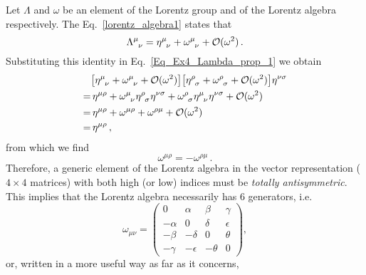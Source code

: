 \begin{sol}
    Let $\Lambda$ and $\omega$ be an element of the Lorentz group and of the Lorentz algebra respectively. The Eq.~\eqref{lorentz_algebra1} states that
    \begin{equation}
        \tensor{\Lambda}{^\mu_\nu} = \tensor{\g}{^\mu_\nu} + \tensor{\omega}{^\mu_\nu} + \mathcal{O}(\omega^2) \, .
    \end{equation}
    Substituting this identity in Eq.~\eqref{Eq_Ex4_Lambda_prop_1} we obtain
    \begin{equation}
    \begin{split}
        & \big[\tensor{\g}{^\mu_\nu} + \tensor{\omega}{^\mu_\nu} + \mathcal{O}(\omega^2)\big] \big[\tensor{\g}{^\rho_\sigma} + \tensor{\omega}{^\rho_\sigma} + \mathcal{O}(\omega^2)\big] \g^{\nu \sigma} \\
        = & \, \g^{\mu \rho} + \tensor{\omega}{^\mu_\nu} \tensor{\g}{^\rho_\sigma} \g^{\nu \sigma} + \tensor{\omega}{^\rho_\sigma} \tensor{\g}{^\mu_\nu} \g^{\nu \sigma} + \mathcal{O}(\omega^2) \\
        = & \, \g^{\mu \rho} + \omega^{\mu \rho} + \omega^{\rho \mu} + \mathcal{O}(\omega^2) \\
        = & \, \g^{\mu\rho} \, ,
    \end{split}
    \end{equation}
    from which we find
    \begin{equation}
        \omega^{\mu \rho} = - \omega^{\rho \mu} \, .
    \end{equation}
    Therefore, a generic element of the Lorentz algebra in the vector representation ($4 \times 4$ matrices) with both high (or low) indices must be \textit{totally antisymmetric}. This implies that the Lorentz algebra necessarily has 6 generators, i.e.
    \begin{equation}
        \omega_{\mu \nu} = 
        \begin{pmatrix}
            0          & \alpha     & \beta    & \gamma \\
            - \alpha   & 0          & \delta   & \epsilon \\
            -\beta     & - \delta   & 0        & \theta \\
            - \gamma   & - \epsilon & - \theta & 0 
        \end{pmatrix} ,
    \end{equation}
    or, written in a more useful way as far as it concerns, 
    \begin{equation}

\end{equation}
\end{sol}
